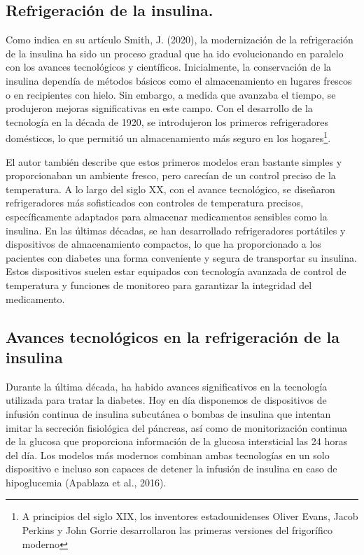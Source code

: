 \subsection{Refrigeración de la insulina. }

Como indica en su artículo Smith, J. (2020), la modernización de la refrigeración de la insulina ha sido un proceso gradual que ha ido evolucionando en paralelo con los avances tecnológicos y científicos. Inicialmente, la conservación de la insulina dependía de métodos básicos como el almacenamiento en lugares frescos o en recipientes con hielo. Sin embargo, a medida que avanzaba el tiempo, se produjeron mejoras significativas en este campo. Con el desarrollo de la tecnología en la década de 1920, se introdujeron los primeros refrigeradores domésticos, lo que permitió un almacenamiento más seguro en los hogares\footnote{A principios del siglo XIX, los inventores estadounidenses Oliver Evans, Jacob Perkins y John Gorrie desarrollaron las primeras versiones del frigorífico moderno}. 

El autor también describe que estos primeros modelos eran bastante simples y proporcionaban un ambiente fresco, pero carecían de un control preciso de la temperatura. A lo largo del siglo XX, con el avance tecnológico, se diseñaron refrigeradores más sofisticados con controles de temperatura precisos, específicamente adaptados para almacenar medicamentos sensibles como la insulina. En las últimas décadas, se han desarrollado refrigeradores portátiles y dispositivos de almacenamiento compactos, lo que ha proporcionado a los pacientes con diabetes una forma conveniente y segura de transportar su insulina. Estos dispositivos suelen estar equipados con tecnología avanzada de control de temperatura y funciones de monitoreo para garantizar la integridad del medicamento.

\subsection{Avances tecnológicos en la refrigeración de la insulina}

Durante la última década, ha habido avances significativos en la tecnología utilizada para tratar la diabetes. Hoy en día disponemos de dispositivos de infusión continua de insulina subcutánea o bombas de insulina que intentan imitar la secreción fisiológica del páncreas, así como de monitorización continua de la glucosa que proporciona información de la glucosa intersticial las 24 horas del día. Los modelos más modernos combinan ambas tecnologías en un solo dispositivo e incluso son capaces de detener la infusión de insulina en caso de hipoglucemia (Apablaza et al., 2016). 

